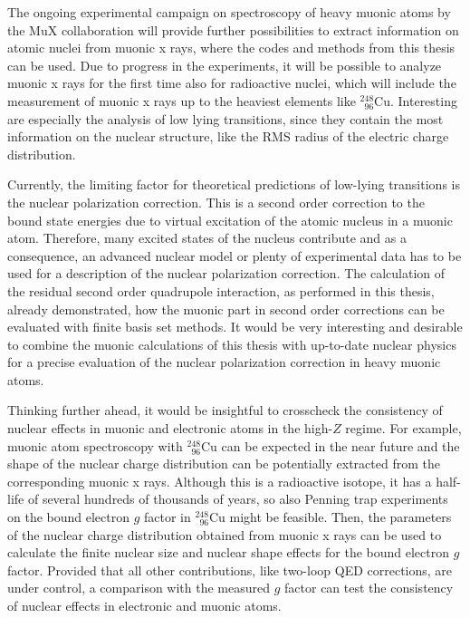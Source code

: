 The ongoing experimental campaign on spectroscopy of heavy muonic atoms by the MuX collaboration will provide further possibilities to extract information on atomic nuclei from muonic x rays, where the codes and methods from this thesis can be used. 
Due to progress in the experiments, it will be possible to analyze muonic x rays for the first time also for radioactive nuclei, which will include the measurement of muonic x rays up to the heaviest elements like $_{\phantom{1}96}^{248}$Cu.
Interesting are especially the analysis of low lying transitions, since they contain the most information on the nuclear structure, like the RMS radius of the electric charge distribution.

Currently, the limiting factor for theoretical predictions of low-lying transitions is the nuclear polarization correction. This is a second order correction to the bound state energies due to virtual excitation of the atomic nucleus in a muonic atom. Therefore, many excited states of the nucleus contribute and as a consequence, an advanced nuclear model or plenty of experimental data has to be used for a description of the nuclear polarization correction.
The calculation of the residual second order quadrupole interaction, as performed in this thesis, already demonstrated, how the muonic part in second order corrections can be evaluated with finite basis set methods. It would be very interesting and desirable to combine the muonic calculations of this thesis with up-to-date nuclear physics for a precise evaluation of the nuclear polarization correction in heavy muonic atoms.

Thinking further ahead, it would be insightful to crosscheck the consistency of nuclear effects in muonic and electronic atoms in the high-$Z$ regime. 
For example, muonic atom spectroscopy with $_{\phantom{1}96}^{248}$Cu can be expected in the near future and the shape of the nuclear charge distribution can be potentially extracted from the corresponding muonic x rays. Although this is a radioactive isotope, it has a half-life of several hundreds of thousands of years, so also Penning trap experiments on the bound electron $g$ factor in $_{\phantom{1}96}^{248}$Cu might be feasible. Then, the parameters of the nuclear charge distribution obtained from muonic x rays can be used to calculate the finite nuclear size and nuclear shape effects for the bound electron $g$ factor. Provided that all other contributions, like two-loop QED corrections, are under control, a comparison with the measured $g$ factor can test the consistency of nuclear effects in electronic and muonic atoms.

